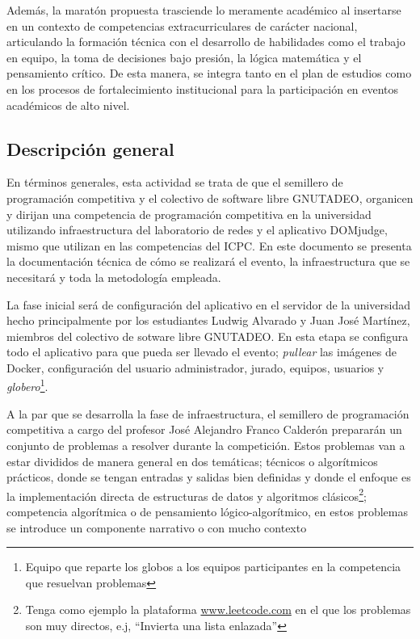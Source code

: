 \documentclass{article}
\begin{document}
Además, la maratón propuesta trasciende lo meramente académico al insertarse en un contexto de competencias extracurriculares de carácter nacional, articulando la formación técnica con el desarrollo de habilidades como el trabajo en equipo, la toma de decisiones bajo presión, la lógica matemática y el pensamiento crítico. De esta manera, se integra tanto en el plan de estudios como en los procesos de fortalecimiento institucional para la participación en eventos académicos de alto nivel.


\subsection{Descripción general}

En términos generales, esta actividad se trata de que el semillero de programación competitiva y el colectivo de software libre GNUTADEO, organicen y dirijan una competencia de programación competitiva en la universidad utilizando infraestructura del laboratorio de redes y el aplicativo DOMjudge\cite{domjudge-docs}, mismo que utilizan en las competencias del ICPC\cite{domjudge-about}. En este documento se presenta la documentación técnica de cómo se realizará el evento, la infraestructura que se necesitará y toda la metodología empleada.

La fase inicial será de configuración del aplicativo en el servidor de la universidad hecho principalmente por los estudiantes Ludwig Alvarado y Juan José Martínez, miembros del colectivo de sotware libre GNUTADEO. En esta etapa se configura todo el aplicativo para que pueda ser llevado el evento; \textit{pullear} las imágenes de Docker\cite{domjudge-judgehost,domjudge-domserver}, configuración del usuario administrador, jurado, equipos, usuarios y \textit{globero}\footnote{Equipo que reparte los globos a los equipos participantes en la competencia que resuelvan problemas}.


A la par que se desarrolla la fase de infraestructura, el semillero de programación competitiva a cargo del profesor José Alejandro Franco Calderón prepararán un conjunto de problemas a resolver durante la competición. Estos problemas van a estar divididos de manera general en dos temáticas; técnicos o algorítmicos prácticos, donde se tengan entradas y salidas bien definidas y donde el enfoque es la implementación directa de estructuras de datos y algoritmos clásicos\footnote{Tenga como ejemplo la plataforma \url{www.leetcode.com}\cite{leetcode} en el que los problemas son muy directos, e.j, ``Invierta una lista enlazada''}; competencia algorítmica o de pensamiento lógico-algorítmico, en estos problemas se introduce un componente narrativo o con mucho contexto
\end{document}
